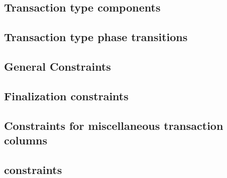 \subsection{Transaction type \rlp{} components}                                   \label{rlp txn v2: generalities: transaction type rlp components}    
\subsection{Transaction type phase transitions}                                   \label{rlp txn v2: generalities: admissible rlp component flags}     
\subsection{General Constraints}                                                  \label{rlp txn v2: generalities: indices and limb constructed}       
\subsection{Finalization constraints}                                             \label{rlp txn v2: generalities: heartbeat}                          
\subsection{Constraints for miscellaneous transaction columns}                    \label{rlp txn v2: generalities: miscellaneous txn columns}          
\subsection{ constraints}  \label{rlp txn v2: generalities: TMP k column generalities}          
